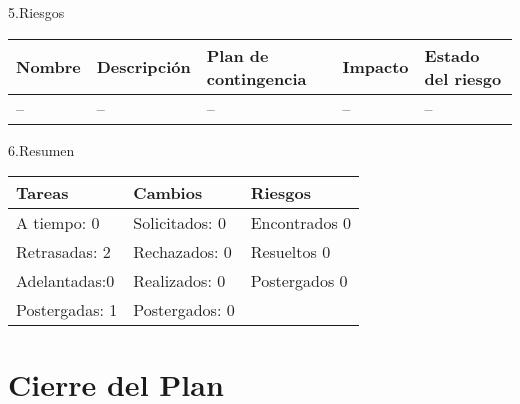 \documentclass[12pt]{report}
\numberwithin{equation}{section}
\begin{document}
\begin{flushleft}
\large{5.Riesgos}\\


\begin{table}[H]
\begin{tabular}{|m{2cm}|m{4cm}|m{4cm}|m{2cm}|m{2cm}|}
\hline 
\textbf{Nombre } & \textbf{Descripci\'on} & \textbf{Plan de contingencia} & \textbf{Impacto} & \textbf{Estado del riesgo}  \\
\hline
\hline
\small{--} &\small{--} & \small{--} & --   & -- \\
\hline
\end{tabular}
\label{tabla: TABLA CE de nuevos riesgos Seg}
\end{table}

\large{6.Resumen}\\

\begin{table}[H]
\begin{tabular}{|m{5cm}|m{5cm}|m{5cm}|}
\hline
\textbf{Tareas} & \textbf{Cambios} & \textbf{Riesgos}\\
\hline \hline 
A tiempo: 0 & Solicitados: 0 & Encontrados 0 \\
\hline
Retrasadas: 2 & Rechazados: 0 & Resueltos 0 \\
\hline
Adelantadas:0  & Realizados: 0  & Postergados 0 \\
\hline
Postergadas: 1 & Postergados:  0 & \\
\hline
\end{tabular}
\label{tabla: TABLA CE Resumen}
\end{table}

\end{flushleft}

\newpage






\centering \section{Cierre del Plan}\label{CE Cierre}
\end{document}
